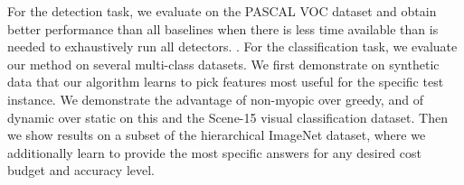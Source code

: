 
For the detection task, we evaluate on the PASCAL VOC dataset and obtain better performance than all baselines when there is less time available than is needed to exhaustively run all detectors.
.
For the classification task, we evaluate our method on several multi-class datasets.
We first demonstrate on synthetic data that our algorithm learns to pick features most useful for the specific test instance.
We demonstrate the advantage of non-myopic over greedy, and of dynamic over static on this and the Scene-15 visual classification dataset.
Then we show results on a subset of the hierarchical ImageNet dataset, where we additionally learn to provide the most specific answers for any desired cost budget and accuracy level.
